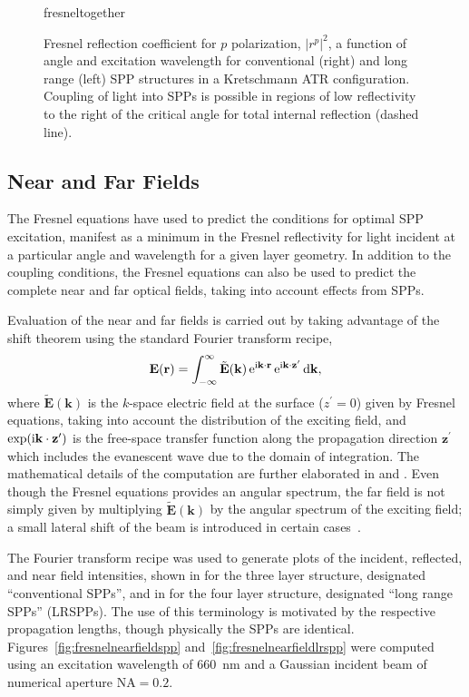 \begin{figure}[ht]
\centering
{fresneltogether}
\caption{Fresnel reflection coefficient for $p$ polarization, $|r^p|^2$, a
function of angle and excitation wavelength for conventional (right) and
long range (left) SPP structures in a Kretschmann ATR configuration.
Coupling of light into SPPs is possible in regions of low reflectivity to the right of the
critical angle for total internal reflection (dashed line).}
\label{fig:fresnelangle}
\end{figure}

\subsection{Near and Far Fields}\label{sec:fresnelnearfar}
The Fresnel equations have used to predict the conditions for
optimal SPP excitation, manifest as a minimum in the Fresnel reflectivity
for light incident at a particular angle and wavelength for a given layer
geometry.  In addition to the coupling conditions, the Fresnel equations
can also be used to predict the complete near and far optical fields,
taking into account effects from SPPs.

Evaluation of the near and far fields is carried out by taking advantage of
the shift theorem using the standard Fourier transform recipe,
\begin{equation}
\mathbf{E}(\mathbf{r}) = \int_{-\infty}^{\infty} \tilde{\mathbf{E}}(\mathbf{k})
\,{\mathrm{e}}^{{\mathrm{i}} \mathbf{k} \cdot \mathbf{r}}
\,{\mathrm{e}}^{{\mathrm{i}} \mathbf{k} \cdot \mathbf{z}^\prime} \,\mathrm{d} \mathbf{k},
\end{equation}
where $\tilde{\mathbf{E}}(\mathbf{k})$ is the $k$-space electric field at
the surface ($z^\prime=0$) given by Fresnel equations, taking into account
the distribution of the exciting field, and $\exp({\mathrm{i}} \mathbf{k} \cdot
\mathbf{z}^\prime)$ is the free-space transfer function along the
propagation direction $\mathbf{z}^\prime$ which includes the evanescent
wave due to the domain of integration.  The mathematical details of the
computation are further elaborated in  and
.  Even though the Fresnel equations provides 
an angular spectrum, the far field is not simply given by multiplying
$\tilde{\mathbf{E}}(\mathbf{k})$ by the angular spectrum of the exciting
field; a small lateral shift of the beam is introduced in certain
cases~\cite{chuang1986lateral}.

The Fourier transform recipe was used to generate plots of the incident,
reflected, and near field intensities, shown in
 for the three layer structure, designated
``conventional SPPs'', and in  for the
four layer structure, designated ``long range SPPs'' (LRSPPs).  The use of
this terminology is motivated by the respective propagation lengths,
though physically the SPPs are identical.
Figures~\ref{fig:fresnelnearfieldspp} and~\ref{fig:fresnelnearfieldlrspp}
were computed using an excitation wavelength of \SI{660}{\nano\meter}
and a Gaussian incident beam of numerical aperture $\mathrm{NA}=0.2$. 

